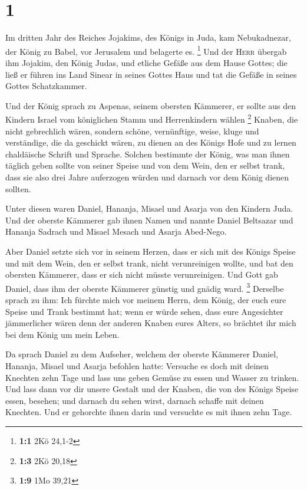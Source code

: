 \hypertarget{section}{%
\section{1}\label{section}}

 Im dritten Jahr des Reiches Jojakims, des Königs in Juda,
kam Nebukadnezar, der König zu Babel, vor Jerusalem und belagerte es.
\footnote{\textbf{1:1} 2Kö 24,1-2}  Und der \textsc{Herr}
übergab ihm Jojakim, den König Judas, und etliche Gefäße aus dem Hause
Gottes; die ließ er führen ins Land Sinear in seines Gottes Haus und tat
die Gefäße in seines Gottes Schatzkammer.

 Und der König sprach zu Aspenas, seinem obersten
Kämmerer, er sollte aus den Kindern Israel vom königlichen Stamm und
Herrenkindern wählen \footnote{\textbf{1:3} 2Kö 20,18} 
Knaben, die nicht gebrechlich wären, sondern schöne, vernünftige, weise,
kluge und verständige, die da geschickt wären, zu dienen an des Königs
Hofe und zu lernen chaldäische Schrift und Sprache. 
Solchen bestimmte der König, was man ihnen täglich geben sollte von
seiner Speise und von dem Wein, den er selbst trank, dass sie also drei
Jahre auferzogen würden und darnach vor dem König dienen sollten.

 Unter diesen waren Daniel, Hananja, Misael und Asarja von
den Kindern Juda.  Und der oberste Kämmerer gab ihnen
Namen und nannte Daniel Beltsazar und Hananja Sadrach und Misael Mesach
und Asarja Abed-Nego.

 Aber Daniel setzte sich vor in seinem Herzen, dass er
sich mit des Königs Speise und mit dem Wein, den er selbst trank, nicht
verunreinigen wollte, und bat den obersten Kämmerer, dass er sich nicht
müsste verunreinigen.  Und Gott gab Daniel, dass ihm der
oberste Kämmerer günstig und gnädig ward. \footnote{\textbf{1:9} 1Mo
  39,21}  Derselbe sprach zu ihm: Ich fürchte mich vor
meinem Herrn, dem König, der euch eure Speise und Trank bestimmt hat;
wenn er würde sehen, dass eure Angesichter jämmerlicher wären denn der
anderen Knaben eures Alters, so brächtet ihr mich bei dem König um mein
Leben.

 Da sprach Daniel zu dem Aufseher, welchem der oberste
Kämmerer Daniel, Hananja, Misael und Asarja befohlen hatte:
 Versuche es doch mit deinen Knechten zehn Tage und lass
uns geben Gemüse zu essen und Wasser zu trinken.  Und
lass dann vor dir unsere Gestalt und der Knaben, die von des Königs
Speise essen, besehen; und darnach du sehen wirst, darnach schaffe mit
deinen Knechten.  Und er gehorchte ihnen darin und
versuchte es mit ihnen zehn Tage.

